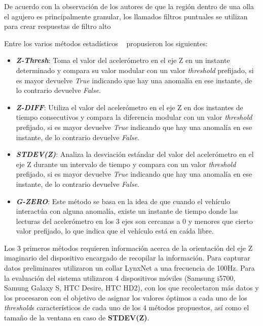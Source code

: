 De acuerdo con la observación de los autores de que la región dentro de una olla
el agujero es principalmente granular, los llamados filtros puntuales se utilizan para crear
respuestas de filtro alto


Entre los varios métodos estadísticos ~\parencite{mednis2011real} propusieron los siguientes:\\

\begin{itemize}
	\item  \emph{\textbf {Z-Thresh}}: Toma el valor del acelerómetro en el eje Z en un instante determinado y compara su valor modular con 
	un valor \emph{threshold} prefijado, si es mayor devuelve \emph{True} indicando que hay una anomalía en ese instante, de lo contrario
	devuelve \emph{False}.\\
	\item \emph{\textbf {Z-DIFF}}: Utiliza el valor del acelerómetro en el eje Z en dos instantes de tiempo consecutivos y compara la
		diferencia modular con un valor \emph{threshold} prefijado, si es mayor devuelve \emph{True} indicando que hay una anomalía en ese
		instante, de lo contrario devuelve \emph{False}.\\
	\item \emph{\textbf {STDEV(Z)}}: Analiza la desviación estándar del valor del acelerómetro en el eje Z durante un intervalo de
		tiempo y compara con un valor \emph{threshold} prefijado, si es mayor devuelve \emph{True} indicando que hay una anomalía en ese
		instante, de lo contrario devuelve \emph{False}.\\ 
	\item \emph{\textbf {G-ZERO}}: Este método se basa en la idea de que cuando el vehículo interactúa con alguna anomalía, existe un
		instante de tiempo donde las lecturas del acelerómetro en los 3 ejes son cercanas a 0 y menores que cierto valor prefijado, lo que
		indica que el vehículo está en caída libre.\\
\end{itemize}

Los 3 primeros métodos requieren información acerca de la orientación del eje Z imaginario del dispositivo encargado de recopilar la información. 
Para capturar datos preliminares utilizaron un collar LynxNet a una frecuencia de 100Hz. Para la evaluación del sistema utilizaron 4 dispositivos
móviles (Samsung i5700, Samung Galaxy S, HTC Desire, HTC HD2), con los que recolectaron más datos y los procesaron con el objetivo de asignar los 
valores óptimos a cada uno de los \emph{threshold}s característicos de cada uno de los 4 métodos propuestos, así como el tamaño de la ventana en caso de 
\textbf {STDEV(Z)}.\\

